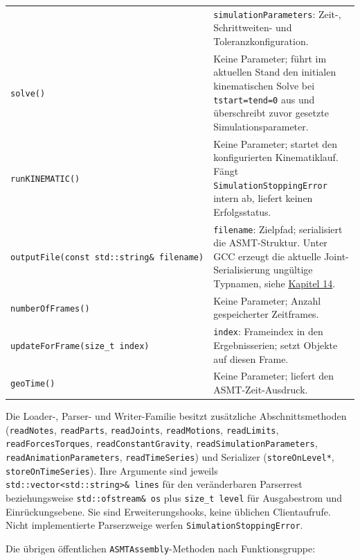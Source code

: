 \documentclass[
  12pt
]{book}
\begin{document}
\begin{longtable}[]{@{}
  >{\raggedright\arraybackslash}p{}
  >{\raggedright\arraybackslash}p{}@{}}
& \texttt{simulationParameters}: Zeit-, Schrittweiten- und
Toleranzkonfiguration. \\
\texttt{solve()} & Keine Parameter; führt im aktuellen Stand den
initialen kinematischen Solve bei \texttt{tstart=tend=0} aus und
überschreibt zuvor gesetzte Simulationsparameter. \\
\texttt{runKINEMATIC()} & Keine Parameter; startet den konfigurierten
Kinematiklauf. Fängt \texttt{SimulationStoppingError} intern ab, liefert
keinen Erfolgsstatus. \\
\texttt{outputFile(const\ std::string\&\ filename)} & \texttt{filename}:
Zielpfad; serialisiert die ASMT-Struktur. Unter GCC erzeugt die aktuelle
Joint-Serialisierung ungültige Typnamen, siehe
\protect\hyperlink{kap-solve-ergebnisse}{Kapitel 14}. \\
\texttt{numberOfFrames()} & Keine Parameter; Anzahl gespeicherter
Zeitframes. \\
\texttt{updateForFrame(size\_t\ index)} & \texttt{index}: Frameindex in
den Ergebnisserien; setzt Objekte auf diesen Frame. \\
\texttt{geoTime()} & Keine Parameter; liefert den ASMT-Zeit-Ausdruck. \\
\end{longtable}

Die Loader-, Parser- und Writer-Familie besitzt zusätzliche
Abschnittsmethoden (\texttt{readNotes}, \texttt{readParts},
\texttt{readJoints}, \texttt{readMotions}, \texttt{readLimits},
\texttt{readForcesTorques}, \texttt{readConstantGravity},
\texttt{readSimulationParameters}, \texttt{readAnimationParameters},
\texttt{readTimeSeries}) und Serializer (\texttt{storeOnLevel*},
\texttt{storeOnTimeSeries}). Ihre Argumente sind jeweils
\texttt{std::vector\textless{}std::string\textgreater{}\&\ lines} für
den veränderbaren Parserrest beziehungsweise
\texttt{std::ofstream\&\ os} plus \texttt{size\_t\ level} für
Ausgabestrom und Einrückungsebene. Sie sind Erweiterungshooks, keine
üblichen Clientaufrufe. Nicht implementierte Parserzweige werfen
\texttt{SimulationStoppingError}.

Die übrigen öffentlichen \texttt{ASMTAssembly}-Methoden nach
Funktionsgruppe:
\end{document}

